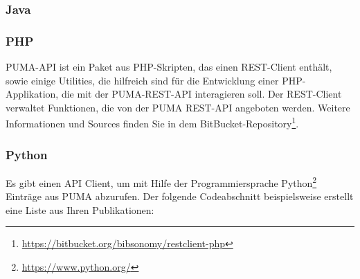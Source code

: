 \documentclass[b5paper,11pt,twoside]{scrbook} %
\begin{document}
\subsubsection{Java}    


\subsubsection{PHP}
PUMA-API ist ein Paket aus PHP-Skripten, das einen REST-Client enthält, sowie einige Utilities, die hilfreich sind für die Entwicklung einer PHP-Applikation, die mit der PUMA-REST-API interagieren soll. Der REST-Client verwaltet Funktionen, die von der PUMA REST-API angeboten werden.
\newline
Weitere Informationen und Sources finden Sie in dem BitBucket-Repository\footnote{\url{https://bitbucket.org/bibsonomy/restclient-php}}.  

\subsubsection{Python}
Es gibt einen API Client, um mit Hilfe der Programmiersprache Python\footnote{\url{https://www.python.org/}} Einträge aus PUMA abzurufen. Der folgende Codeabschnitt beispielsweise erstellt eine Liste aus Ihren Publikationen:

 
\end{document}

